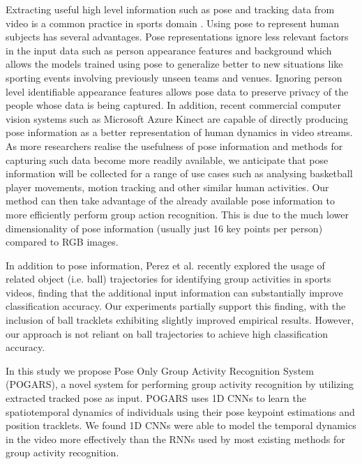 \documentclass[a4paper,fleqn]{cas-dc}
\begin{document}
Extracting useful high level information such as pose and tracking data from video is a common practice in sports domain \cite{Baradel2017_poseConditioned,Carreira2017_kinetics,Mehrasa2018_DeepTrajectory,Zhu2018_actionMachine}. 
Using pose to represent human subjects has several advantages. 
Pose representations ignore less relevant factors in the input data such as person appearance features and background which allows the models trained using pose to generalize better to new situations like sporting events involving previously unseen teams and venues. 
Ignoring person level identifiable appearance features allows pose data to preserve privacy of the people whose data is being captured. 
In addition, recent commercial computer vision systems such as Microsoft Azure Kinect are capable of directly producing pose information as a better representation of human dynamics in video streams. 
As more researchers realise the usefulness of pose information and methods for capturing such data become more readily available, we anticipate that pose information will be collected for a range of use cases such as analysing basketball player movements, motion tracking and other similar human activities. 
Our method can then take advantage of the already available pose information to more efficiently perform group action recognition. 
This is due to the much lower dimensionality of pose information (usually just 16 key points per person) compared to RGB images.

In addition to pose information, Perez et al.\cite{Perez2020_SkeletonBased_GIRN} recently explored the usage of related object (i.e. ball) trajectories for identifying group activities in sports videos, finding that the additional input information can substantially improve classification accuracy. 
Our experiments partially support this finding, with the inclusion of ball tracklets exhibiting slightly improved empirical results. 
However, our approach is not reliant on ball trajectories to achieve high classification accuracy.

In this study we propose Pose Only Group Activity Recognition System (POGARS), a novel system for performing group activity recognition by utilizing extracted tracked pose as input. 
POGARS uses 1D CNNs to learn the spatiotemporal dynamics of individuals using their pose keypoint estimations and position tracklets. 
We found 1D CNNs were able to model the temporal dynamics in the video more effectively than the RNNs used by most existing methods for group activity recognition.
\end{document}
